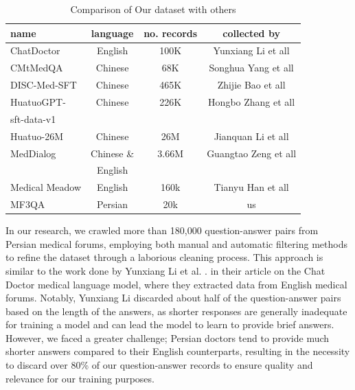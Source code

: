 \documentclass[conference]{IEEEtran}
\begin{document}
\begin{table}[ht]
	\centering
	\caption{Comparison of Our dataset with others}
	\begin{tabular}{|l|c|c|c|}  %
		\hline
   name            &language & no. records & collected by \\ \hline
   ChatDoctor 	   &English	 & 100K        & Yunxiang Li et all
   \cite{b6}
    \\ \hline
   CMtMedQA  	   &Chinese	 & 68K        &  Songhua Yang et all
   \cite{b19}
   \\ \hline
   DISC-Med-SFT	   &Chinese	 & 465K       & Zhijie Bao et all   
   \cite{b20}
   \\ \hline
   HuatuoGPT-	   &Chinese	 & 226K        & Hongbo Zhang et all   
   \cite{b21}
    \\ 
   sft-data-v1	   &	     &             & 	\\ \hline
   Huatuo-26M	   &Chinese	 & 26M         & Jianquan Li et all 
   \cite{b22}
   \\ \hline
   MedDialog       &Chinese \&&3.66M       & Guangtao Zeng et all  \\ 
                   &English  &             &  \cite{b23} \\ \hline
   Medical Meadow  &English  & 160k        & Tianyu Han et all 
   \cite{b24}
   \\ \hline
   MF3QA           &Persian  & 20k            & us \\ \hline
	\end{tabular}
	\label{tab:model_results_on_mcqa}
\end{table}


In our research, we crawled more than 180,000 question-answer pairs from Persian medical forums, employing both manual and automatic filtering methods to refine the dataset through a laborious cleaning process. This approach is similar to the work done by Yunxiang Li et al. \cite{b6}. in their article on the Chat Doctor medical language model, where they extracted data from English medical forums. Notably, Yunxiang Li discarded about half of the question-answer pairs based on the length of the answers, as shorter responses are generally inadequate for training a model and can lead the model to learn to provide brief answers. However, we faced a greater challenge; Persian doctors tend to provide much shorter answers compared to their English counterparts, resulting in the necessity to discard over 80\% of our question-answer records to ensure quality and relevance for our training purposes.
\end{document}
